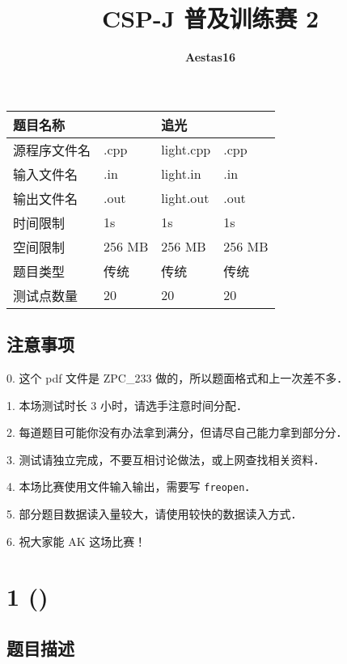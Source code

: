 \title{CSP-J 普及训练赛 2}
\author{\textbf{\color{black}A\color{red}estas16}}

	\maketitle
	\begin{center}
		\begin{tabular}{|p{3cm}|p{2.5cm}|p{2.5cm}|p{2.5cm}|}
			\hline
			题目名称 & & 追光 &    \\
			\hline
			源程序文件名 & .cpp & light.cpp & .cpp   \\
			\hline
			输入文件名 & .in & light.in & .in   \\
			\hline
			输出文件名 & .out & light.out & .out  \\
			\hline
			时间限制 & 1s & 1s & 1s \\ 
			\hline
			空间限制 & 256 MB & 256 MB & 256 MB\\
			\hline
			题目类型 & 传统 & 传统 & 传统 \\
			\hline
			测试点数量 & 20 & 20 & 20 \\
			\hline
		\end{tabular}
	\end{center}
	\subsection*{注意事项}
		0. 这个 pdf 文件是 ZPC\_233 做的，所以题面格式和上一次差不多．
	
		1. 本场测试时长 3 小时，请选手注意时间分配．
		
		2. 每道题目可能你没有办法拿到满分，但请尽自己能力拿到部分分．
		
		3. 测试请独立完成，不要互相讨论做法，或上网查找相关资料．
		
		4. 本场比赛使用文件输入输出，需要写 \texttt{freopen}．
		
		5. 部分题目数据读入量较大，请使用较快的数据读入方式．
		
		6. 祝大家能 AK 这场比赛！
	\newpage
	\section*{1 ()}
	\subsection*{题目描述}
